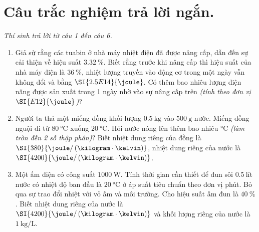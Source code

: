 \section{Câu trắc nghiệm trả lời ngắn.} \textit{Thí sinh trả lời từ câu 1 đến câu 6.}
\begin{enumerate}[label=\bfseries Câu \arabic*:, leftmargin=1.7cm]
	\item Giả sử rằng các tuabin ở nhà máy nhiệt điện đã được nâng cấp, dẫn đến sự cải thiện về hiệu suất $\SI{3.32}{\percent}$. Biết rằng trước khi nâng cấp thì hiệu suất của nhà máy điện là $\SI{36}{\percent}$, nhiệt lượng truyền vào động cơ trong một ngày vẫn không đổi và bằng $\SI{2.5E14}{\joule}$. Có thêm bao nhiêu lượng điện năng được sản xuất trong 1 ngày nhờ vào sự nâng cấp trên \textit{(tính theo đơn vị  $\SI{E12}{\joule}$)}?
	
	\item Người ta thả một miếng đồng khối lượng $\SI{0.5}{\kilogram}$ vào $\SI{500}{\gram}$ nước. Miếng đồng nguội đi từ $\SI{80}{\celsius}$ xuống $\SI{20}{\celsius}$. Hỏi nước nóng lên thêm bao nhiêu $\si{\celsius}$ \textit{(làm tròn đến 2 số thập phân)}? Biết nhiệt dung riêng của đồng là $\SI{380}{\joule/\left(\kilogram\cdot\kelvin\right)}$, nhiệt dung riêng của nước là $\SI{4200}{\joule/\left(\kilogram\cdot\kelvin\right)}$.

\item Một ấm điện có công suất $\SI{1000}{\watt}$. Tính thời gian cần thiết để đun sôi $\SI{0.5}{\text{lít}}$ nước có nhiệt độ ban đầu là $\SI{20}{\celsius}$ ở áp suất tiêu chuẩn theo đơn vị phút. Bỏ qua sự trao đổi nhiệt với vỏ ấm và môi trường. Cho hiệu suất ấm đun là $\SI{40}{\percent}$. Biết nhiệt dung riêng của nước là $\SI{4200}{\joule/\left(\kilogram\cdot\kelvin\right)}$ và khối lượng riêng của nước là $\SI{1}{\kilogram/\liter}$.


\end{enumerate}
